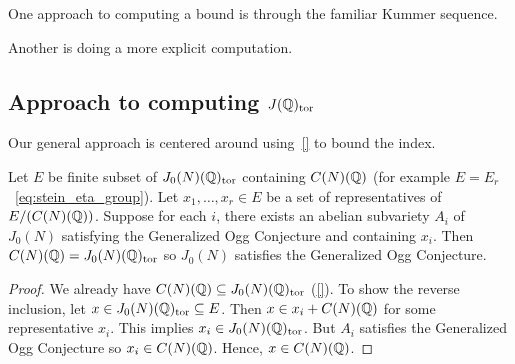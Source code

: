 \documentclass[11pt, proquest]{uwthesis}
\begin{document}
One approach to computing a bound is through the familiar Kummer sequence.

Another is doing a more explicit computation.

\subsection{Approach to computing $J(\mathbb{Q})_{\mathrm{tor}}$}%
\label{sub:approach_to_computing_j_qq__tor_}

Our general approach is centered around using~\ref{} to bound the index.

\begin{proposition}
    Let $E$ be finite subset of $J_0(N)(\mathbb{Q})_{\mathrm{tor}}$ containing $C(N)(\mathbb{Q})$ (for
    example $E=E_r$~\eqref{eq:stein_eta_group}). Let $x_1,\ldots,x_r\in E$ be a
    set of representatives of $E/(C(N)(\mathbb{Q}))$. Suppose for each $i$, there
    exists an abelian subvariety $A_i$ of $J_0(N)$ satisfying the Generalized
    Ogg Conjecture and containing $x_i$. Then $C(N)(\mathbb{Q})=J_0(N)(\mathbb{Q})_{\mathrm{tor}}$ so
    $J_0(N)$ satisfies the Generalized Ogg Conjecture.
\end{proposition}
\begin{proof}
    We already have $C(N)(\mathbb{Q})\subseteq J_0(N)(\mathbb{Q})_{\mathrm{tor}}$ (\ref{}). To show the
    reverse inclusion, let $x\in J_0(N)(\mathbb{Q})_{\mathrm{tor}}\subseteq E$. Then $x\in
    x_i+C(N)(\mathbb{Q})$ for some representative $x_i$. This implies $x_i\in
    J_0(N)(\mathbb{Q})_{\mathrm{tor}}$. But $A_i$ satisfies the Generalized Ogg Conjecture so
    $x_i\in C(N)(\mathbb{Q})$. Hence, $x\in C(N)(\mathbb{Q})$.
\end{proof}
\end{document}

